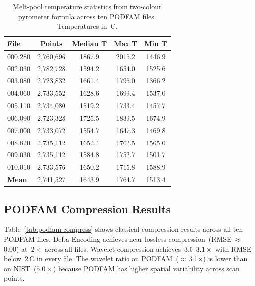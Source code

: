 \begin{table}[H]
\centering
\caption{Melt-pool temperature statistics from two-colour pyrometer formula across ten PODFAM files. Temperatures in~\textdegree C.}
\label{tab:podfam-temps}
\begin{tabular}{lcccc}
\toprule
\textbf{File} & \textbf{Points} & \textbf{Median T} & \textbf{Max T} & \textbf{Min T} \\
\midrule
000.280 & 2,760,696 & 1867.9 & 2016.2 & 1446.9 \\
002.030 & 2,782,728 & 1594.2 & 1654.0 & 1525.6 \\
003.080 & 2,723,832 & 1661.4 & 1796.0 & 1366.2 \\
004.060 & 2,733,552 & 1628.6 & 1699.4 & 1537.0 \\
005.110 & 2,734,080 & 1519.2 & 1733.4 & 1457.7 \\
006.090 & 2,723,328 & 1725.5 & 1839.5 & 1674.9 \\
007.000 & 2,733,072 & 1554.7 & 1647.3 & 1469.8 \\
008.820 & 2,735,112 & 1652.4 & 1762.5 & 1565.0 \\
009.030 & 2,735,112 & 1584.8 & 1752.7 & 1501.7 \\
010.010 & 2,733,576 & 1650.2 & 1715.8 & 1588.9 \\
\midrule
\textbf{Mean} & 2,741,527 & 1643.9 & 1764.7 & 1513.4 \\
\bottomrule
\end{tabular}
\end{table}

\subsection{PODFAM Compression Results}

Table~\ref{tab:podfam-compress} shows classical compression results across all ten PODFAM files. Delta Encoding achieves near-lossless compression~(RMSE\,$\approx$\,0.00) at~$2\times$ across all files. Wavelet compression achieves~$3.0$--$3.1\times$ with RMSE below~2\,\textdegree C in every file. The wavelet ratio on PODFAM~($\approx$\,3.1$\times$) is lower than on NIST~($5.0\times$) because PODFAM has higher spatial variability across scan points.

